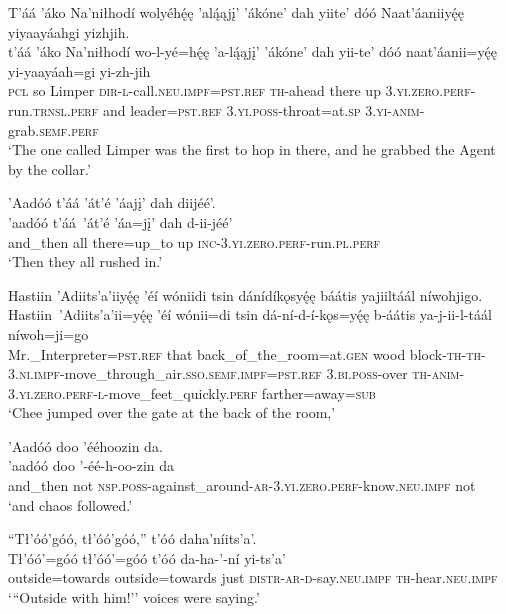\ea\label{ex:text1-38-1}
T’áá ’áko Na’niłhodí wolyéhę́ę ’alą́ąjį’ ’ákóne’ dah yiite’ dóó Naat’áaniiyę́ę yiyaayáahgi yizhjih.\\
\gll t’áá	’áko	Na’niłhodí	wo-l-yé=hę́ę	’a-lą́ąjį’	’ákóne’	dah	yii-te’	dóó	naat’áanii=yę́ę	yi-yaayáah=gi	yi-zh-jih\\
     \textsc{pcl}	so	Limper	\textsc{dir}-\textsc{l}-call.\textsc{neu}.\textsc{impf}=\textsc{pst}.\textsc{ref}	\textsc{th}-ahead	there	up	3.\textsc{yi}.\textsc{zero}.\textsc{perf}-run.\textsc{trnsl}.\textsc{perf}	and	leader=\textsc{pst}.\textsc{ref}	3.\textsc{yi}.\textsc{poss}-throat=at.\textsc{sp}	3.\textsc{yi}-\textsc{anim}-grab.\textsc{semf}.\textsc{perf}\\
\glt `The one called Limper was the first to hop in there, and he grabbed the Agent by the collar.'
\z

\ea\label{ex:text1-38-2}
’Aadóó t’áá ’át’é ’áajį’ dah diijéé’.\\
\gll ’aadóó	t’áá~{’át’é}	’áa=jį’	dah	d-ii-jéé’\\
     and\_then	all	there=up\_to	up	\textsc{inc}-3.\textsc{yi}.\textsc{zero}.\textsc{perf}-run.\textsc{pl}.\textsc{perf}\\
\glt `Then they all rushed in.'
\z

\ea\label{ex:text1-38-3}
Hastiin ’Adiits’a’iiyę́ę ’éí wóniidi tsin dánídíkǫsyę́ę báátis yajiiltáál níwohjigo.\\
\gll Hastiin~’Adiits’a’ii=yę́ę	’éí	wónii=di	tsin	dá-ní-d-í-kǫs=yę́ę	b-áátis	ya-j-ii-l-táál	níwoh=ji=go\\
     Mr.\_Interpreter=\textsc{pst}.\textsc{ref}	that	back\_of\_the\_room=at.\textsc{gen}	wood	block-\textsc{th}-\textsc{th}-3.\textsc{ni}.\textsc{impf}-move\_through\_air.\textsc{sso}.\textsc{semf}.\textsc{impf}=\textsc{pst}.\textsc{ref}	3.\textsc{bi}.\textsc{poss}-over	\textsc{th}-\textsc{anim}-3.\textsc{yi}.\textsc{zero}.\textsc{perf}-\textsc{l}-move\_feet\_quickly.\textsc{perf}	farther=away=\textsc{sub}\\
\glt `Chee jumped over the gate at the back of the room,'
\z

\ea\label{ex:text1-38-4}
’Aadóó doo ’ééhoozin da.\\
\gll ’aadóó	doo	’-éé-h-oo-zin	da\\
     and\_then	not	\textsc{nsp}.\textsc{poss}-against\_around-\textsc{ar}-3.\textsc{yi}.\textsc{zero}.\textsc{perf}-know.\textsc{neu}.\textsc{impf}	not\\
\glt `and chaos followed.'
\z

\ea\label{ex:text1-39}
``Tł’óó’góó, tł’óó’góó,'' t’óó daha’níits’a’.\\
\gll Tł’óó’=góó	tł’óó’=góó	t’óó	da-ha-’-ní yi-ts’a’\\
     outside=towards	outside=towards	just	\textsc{distr}-\textsc{ar}-\textsc{d}-say.\textsc{neu}.\textsc{impf} \textsc{th}-hear.\textsc{neu}.\textsc{impf}\\
\glt `{``}Outside with him!'' voices were saying.'
\z

